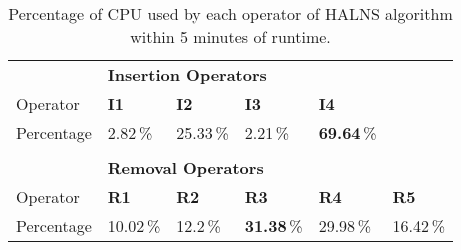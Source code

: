 \documentclass[thesis=M,english]{FITthesis}[2012/10/20]
\begin{document}
    \begin{table}[!ht]
    \centering
    {\renewcommand{\arraystretch}{1.5}
    \begin{tabular}{llllll}
    \hline
               & \multicolumn{5}{l}{\textbf{Insertion Operators}}                    \\
    Operator   & \textbf{I1} & \textbf{I2} & \textbf{I3} & \textbf{I4} & \textbf{}   \\ \hline
    Percentage & 2.82\,\%    & 25.33\,\%   & 2.21\,\%    & \textbf{69.64}\,\%   &             \\
    \multicolumn{6}{l}{}                                                             \\ \hline
               & \multicolumn{5}{l}{\textbf{Removal Operators}}                      \\
    Operator   & \textbf{R1} & \textbf{R2} & \textbf{R3} & \textbf{R4} & \textbf{R5} \\ \hline
    Percentage & 10.02\,\%   & 12.2\,\%    & \textbf{31.38}\,\%   & 29.98\,\%   & 16.42\,\%  
    \end{tabular}}
    \caption{Percentage of CPU used by each operator of HALNS algorithm within 5 minutes of runtime.}
    \label{tab:operators-cpu}
    \end{table}
\end{document}
